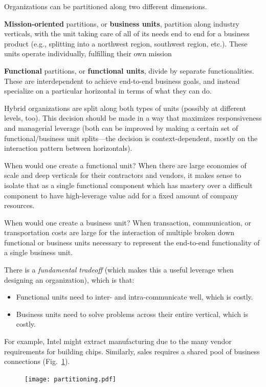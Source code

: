\documentclass{article}
\begin{document}
Organizations can be partitioned along two different dimensions.

\textbf{Mission-oriented} partitions, or \textbf{business units}, partition along industry verticals, with the unit taking care of all of its needs end to end for a business product (e.g., splitting into a northwest region, southwest region, etc.). These units operate individually, fulfilling their own mission

\textbf{Functional} partitions, or \textbf{functional units}, divide by separate functionalities. These are interdependent to achieve end-to-end business goals, and instead specialize on a particular horizontal in terms of what they can do.

Hybrid organizations are split along both types of units (possibly at different levels, too). This decision should be made in a way that maximizes responsiveness and managerial leverage (both can be improved by making a certain set of functional/business unit splits---the decision is context-dependent, mostly on the interaction pattern between horizontals).

When would one create a functional unit? When there are large economies of scale and deep verticals for their contractors and vendors, it makes sense to isolate that as a single functional component which has mastery over a difficult component to have high-leverage value add for a fixed amount of company resources.

When would one create a business unit? When transaction, communication, or transportation costs are large for the interaction of multiple broken down functional or business units necessary to represent the end-to-end functionality of a single business unit.

There is a \textit{fundamental tradeoff} (which makes this a useful leverage when designing an organization), which is that:
\begin{itemize}
\item Functional units need to inter- and intra-communicate well, which is costly.
\item Business units need to solve problems across their entire vertical, which is costly.
\end{itemize}

For example, Intel might extract manufacturing due to the many vendor requirements for building chips. Similarly, sales requires a shared pool of business connections (Fig.~\ref{fig:partitioning}).

\begin{figure}[h]
  \centering
  \texttt{[image: partitioning.pdf]}
  \caption{\label{fig:partitioning} }
\end{figure}
\end{document}
